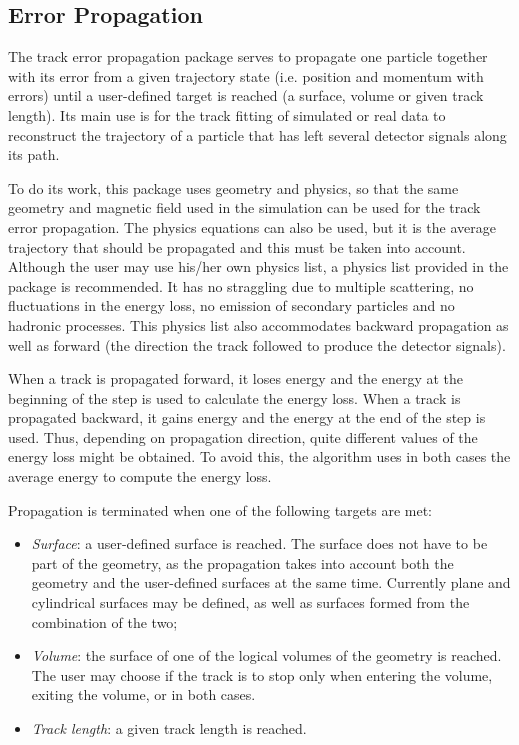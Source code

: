 \label{sec:errorprop}

\subsection{\textbf{Error Propagation}}

The track error propagation package serves to propagate one particle together 
with its error from a given trajectory state (i.e. position and momentum with
errors) until a user-defined target is reached (a surface, volume or given
track length).  Its main use is for the track fitting of simulated or real data
to reconstruct the trajectory of a particle that has left several detector
signals along its path. 

To do its work, this package uses \Gfour{} geometry and physics, so that the 
same geometry and magnetic field used in the simulation can be used for the 
track error propagation.  The \Gfour{} physics equations can also be used, but
it is the average trajectory that should be propagated and this must be taken 
into account.  Although the user may use his/her own physics list, a physics 
list provided in the package is recommended.  It has no straggling due to 
multiple scattering, no fluctuations in the energy loss, no emission of 
secondary particles and no hadronic processes.  This physics list also 
accommodates backward propagation as well as forward (the direction the track 
followed to produce the detector signals).

When a track is propagated forward, it loses energy and the energy at the 
beginning of the step is used to calculate the energy loss.  When a track is
propagated backward, it gains energy and the energy at the end of the step is
used.  Thus, depending on propagation direction, quite different values of the
energy loss might be obtained.  To avoid this, the algorithm uses in both cases
the average energy to compute the energy loss.

Propagation is terminated when one of the following targets are met:
\begin{itemize}
\item \emph{Surface}: a user-defined surface is reached.  The surface does not
      have to be part of the geometry, as the propagation takes into account 
      both the geometry and the user-defined surfaces at the same time.  
      Currently plane and cylindrical surfaces may be defined, as well as
      surfaces formed from the combination of the two;
\item \emph{Volume}: the surface of one of the logical volumes of the geometry
      is reached.  The user may choose if the track is to stop only when 
      entering the volume, exiting the volume, or in both cases.
\item \emph{Track length}: a given track length is reached.
\end{itemize}

